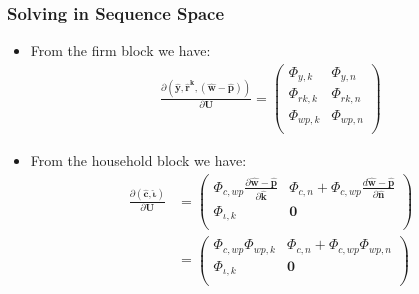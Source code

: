 \documentclass[english,xcolor=svgnames]{beamer}
\begin{document}
\begin{frame}
    \frametitle{Solving in Sequence Space}
		\begin{itemize}
			\item From the firm block we have:
			\begin{align*}
				\frac{\partial (\mathbf{\hat{y}},\mathbf{\hat{r}^k},\mathbf{(\hat{w}-\hat{p})})}{\partial \mathbf{U}} = \begin{pmatrix}
					\Phi_{y,k} & \Phi_{y,n} \\
					\Phi_{rk,k} & \Phi_{rk,n} \\
					\Phi_{wp,k} & \Phi_{wp,n} \\
				\end{pmatrix}
			\end{align*}
			\item From the household block we have:
			\begin{align*}
				\frac{\partial (\mathbf{\hat{c}},\mathbf{\hat{\iota}})}{\partial \mathbf{U}} &= \begin{pmatrix}
					\Phi_{c,wp}\frac{\partial\mathbf{\hat{w}-\hat{p}}}{\partial \mathbf{\hat{k}} } & \Phi_{c,n} + \Phi_{c,wp}\frac{d\mathbf{\hat{w}-\hat{p}}}{\partial \mathbf{\hat{n}} } \\
					\Phi_{\iota,k} & \mathbf{0} \\
				\end{pmatrix} \\
				&= \begin{pmatrix}
					\Phi_{c,wp}\Phi_{wp,k} & \Phi_{c,n} + \Phi_{c,wp}\Phi_{wp,n} \\
					\Phi_{\iota,k} & \mathbf{0} \\
				\end{pmatrix}
			\end{align*}
		\end{itemize}
\end{frame}
\end{document}
